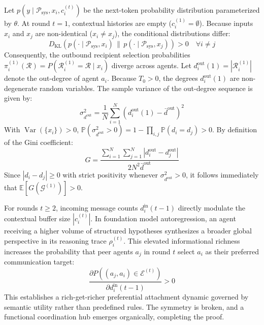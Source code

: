 \documentclass{ieeeaccess}
\begin{document}
\begin{IEEEproof}
Let $p(y \mid \mathcal{P}_{\text{sys}}, x_i, c_i^{(t)})$ be the next-token probability distribution parameterized by $\theta$. At round $t=1$, contextual histories are empty ($c_i^{(1)} = \emptyset$). Because inputs $x_i$ and $x_j$ are non-identical ($x_i \neq x_j$), the conditional distributions differ:
\begin{equation}
D_{\text{KL}}\left( p(\cdot \mid \mathcal{P}_{\text{sys}}, x_i) \,\|\, p(\cdot \mid \mathcal{P}_{\text{sys}}, x_j) \right) > 0 \quad \forall i \neq j
\end{equation}
Consequently, the outbound recipient selection probabilities $\pi_i^{(1)}(\mathcal{R}) = P(\mathcal{R}_i^{(1)} = \mathcal{R} \mid x_i)$ diverge across agents. Let $d_i^{\text{out}}(1) = |\mathcal{R}_i^{(1)}|$ denote the out-degree of agent $a_i$. Because $T_0 > 0$, the degrees $d_i^{\text{out}}(1)$ are non-degenerate random variables. The sample variance of the out-degree sequence is given by:
\begin{equation}
\sigma_{d^{\text{out}}}^2 = \frac{1}{N} \sum_{i=1}^N \left( d_i^{\text{out}}(1) - \bar{d}^{\text{out}} \right)^2
\end{equation}
With $\operatorname{Var}(\{x_i\}) > 0$, $\mathbb{P}(\sigma_{d^{\text{out}}}^2 > 0) = 1 - \prod_{i,j} \mathbb{P}(d_i = d_j) > 0$. By definition of the Gini coefficient:
\begin{equation}
G = \frac{\sum_{i=1}^N \sum_{j=1}^N |d_i^{\text{out}} - d_j^{\text{out}}|}{2 N^2 \bar{d}^{\text{out}}}
\end{equation}
Since $|d_i - d_j| \ge 0$ with strict positivity whenever $\sigma_{d^{\text{out}}}^2 > 0$, it follows immediately that $\mathbb{E}[G(\mathcal{G}^{(1)})] > 0$.

For rounds $t \ge 2$, incoming message counts $d_i^{\text{in}}(t-1)$ directly modulate the contextual buffer size $|c_i^{(t)}|$. In foundation model autoregression, an agent receiving a higher volume of structured hypotheses synthesizes a broader global perspective in its reasoning trace $\rho_i^{(t)}$. This elevated informational richness increases the probability that peer agents $a_j$ in round $t$ select $a_i$ as their preferred communication target:
\begin{equation}
\label{eq:rich_get_richer}
\frac{\partial P((a_j, a_i) \in \mathcal{E}^{(t)})}{\partial d_i^{\text{in}}(t-1)} > 0
\end{equation}
This establishes a rich-get-richer preferential attachment dynamic governed by semantic utility rather than predefined rules. The symmetry is broken, and a functional coordination hub emerges organically, completing the proof.
\end{IEEEproof}
\end{document}
